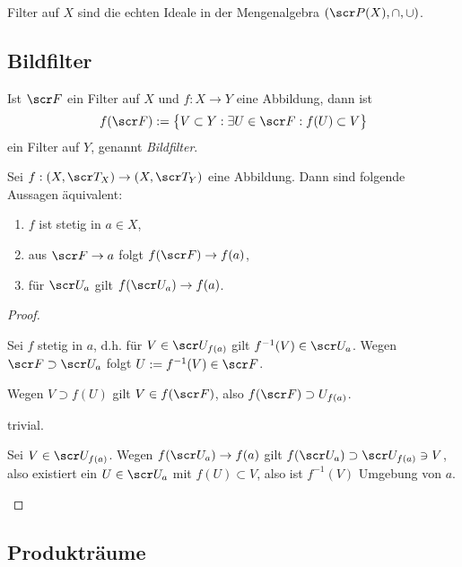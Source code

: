 \begin{nt}
	Filter auf $X$ sind die echten Ideale in der Mengenalgebra $(\scr P(X), \cap, \cup)$.
\end{nt}

\subsection{Bildfilter}

\begin{df}
	Ist $\scr F$ ein Filter auf $X$ und $f: X \to Y$ eine Abbildung, dann ist
	\[
		f(\scr F)
		:= \big\{ V \subset Y : \exists U \in \scr F : f(U) \subset V \big\}
	\]
	ein Filter auf $Y$, genannt \emph{Bildfilter}.
\end{df}

\begin{st}
	Sei $f: (X, \scr T_X) \to (X, \scr T_Y)$ eine Abbildung.
	Dann sind folgende Aussagen äquivalent:
	\begin{enumerate}[1)]
		\item
			$f$ ist stetig in $a \in X$,
		\item
			aus $\scr F \to a$ folgt $f(\scr F) \to f(a)$,
		\item
			für $\scr U_a$ gilt $f(\scr U_a) \to f(a)$.
	\end{enumerate}
	\begin{proof}
		\begin{segnb}[(1)$\implies$(2)]
			Sei $f$ stetig in $a$, d.h. für $V \in \scr U_{f(a)}$ gilt $f^{-1}(V) \in \scr U_a$.
			Wegen $\scr F \supset \scr U_a$ folgt $U := f^{-1}(V) \in \scr F$.

			Wegen $V \supset f(U)$ gilt $V \in f(\scr F)$, also $f(\scr F) \supset U_{f(a)}$.
		\end{segnb}
		\begin{segnb}[(2)$\implies$(3)]
			trivial.
		\end{segnb}
		\begin{segnb}[(3)$\implies$(1)]
			Sei $V \in \scr U_{f(a)}$.
			Wegen $f(\scr U_{a}) \to f(a)$ gilt $f(\scr U_a) \supset \scr U_{f(a)} \ni V$, also existiert ein $U \in \scr U_a$ mit $f(U) \subset V$, also ist $f^{-1}(V)$ Umgebung von $a$.
		\end{segnb}
	\end{proof}
\end{st}

\subsection{Produkträume}

